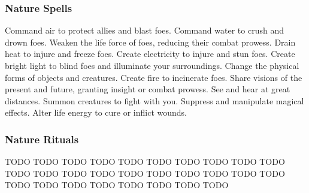 \subsubsection{Nature Spells}\label{Nature Spells}
\begin{spelllist}
 Command air to protect allies and blast foes.
 Command water to crush and drown foes.
 Weaken the life force of foes, reducing their combat prowess.
 Drain heat to injure and freeze foes.
 Create electricity to injure and stun foes.
 Create bright light to blind foes and illuminate your surroundings.
 Change the physical forms of objects and creatures.
 Create fire to incinerate foes.
 Share visions of the present and future, granting insight or combat prowess.
 See and hear at great distances.
 Summon creatures to fight with you.
 Suppress and manipulate magical effects.
 Alter life energy to cure or inflict wounds.
\end{spelllist}
\subsubsection{Nature Rituals}\label{Nature Rituals}
\begin{spelllist}
 TODO
 TODO
 TODO
 TODO
 TODO
 TODO
 TODO
 TODO
 TODO
 TODO
 TODO
 TODO
 TODO
 TODO
 TODO
 TODO
 TODO
 TODO
 TODO
 TODO
 TODO
 TODO
 TODO
 TODO
 TODO
 TODO
 TODO
 TODO
\end{spelllist}

